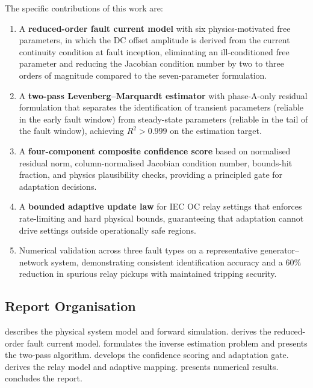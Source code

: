 \documentclass[12pt, a4paper]{article}
\theoremstyle{definition}
\theoremstyle{plain}
\begin{document}
The specific contributions of this work are:
\begin{enumerate}
  \item A \textbf{reduced-order fault current model} with six physics-motivated
        free parameters, in which the DC offset amplitude is derived from the
        current continuity condition at fault inception, eliminating an
        ill-conditioned free parameter and reducing the Jacobian condition
        number by two to three orders of magnitude compared to the
        seven-parameter formulation.

  \item A \textbf{two-pass Levenberg--Marquardt estimator} with phase-A-only
        residual formulation that separates the identification of transient
        parameters (reliable in the early fault window) from steady-state
        parameters (reliable in the tail of the fault window), achieving
        $R^2 > 0.999$ on the estimation target.

  \item A \textbf{four-component composite confidence score} based on
        normalised residual norm, column-normalised Jacobian condition number,
        bounds-hit fraction, and physics plausibility checks, providing a
        principled gate for adaptation decisions.

  \item A \textbf{bounded adaptive update law} for IEC OC relay settings that
        enforces rate-limiting and hard physical bounds, guaranteeing that
        adaptation cannot drive settings outside operationally safe regions.

  \item Numerical validation across three fault types on a representative
        generator--network system, demonstrating consistent identification
        accuracy and a 60\% reduction in spurious relay pickups with maintained
        tripping security.
\end{enumerate}

\subsection{Report Organisation}
\label{sec:intro:organisation}

 describes the physical system model and forward simulation.
 derives the reduced-order fault current model.
 formulates the inverse estimation problem and presents
the two-pass algorithm.   develops the confidence scoring
and adaptation gate.   derives the relay model and adaptive
mapping.   presents numerical results.
 concludes the report.
\end{document}

